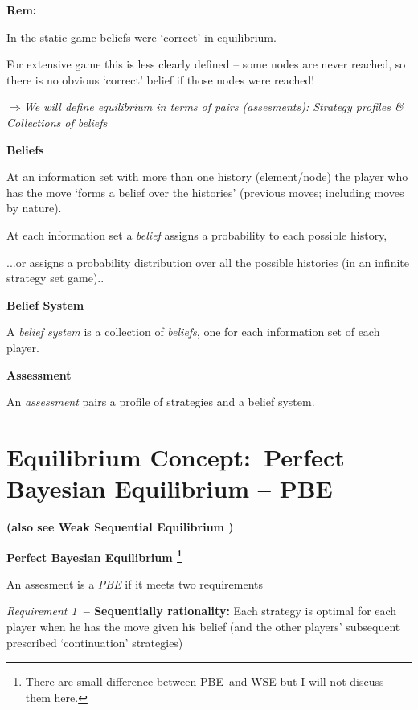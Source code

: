\documentclass{article}
\begin{document}
\textbf{Rem: }\bigskip

In the static game beliefs were `correct' in equilibrium.

\bigskip

For extensive game this is less clearly defined -- some nodes are never
reached, so there is no obvious `correct' belief if those nodes were reached!

\bigskip

$\mathbf{\Longrightarrow }$\textit{We will define equilibrium in terms of
pairs (assesments): Strategy profiles \& Collections of beliefs}

\bigskip

\textbf{Beliefs }

At an information set with more than one history (element/node) the player
who has the move `forms a belief over the histories' (previous moves;
including moves by nature).

At each information set a \textit{belief }assigns a probability to each
possible history,

...or assigns a probability distribution over all the possible histories (in
an infinite strategy set game)..

\bigskip

\textbf{Belief System}

A \textit{belief system }is a collection of \textit{beliefs}, one for each
information set of each player.

\bigskip

\textbf{Assessment}

An \textit{assessment} pairs a profile of strategies and a belief system.

\bigskip

\bigskip

\section{Equilibrium Concept:\ Perfect Bayesian Equilibrium -- PBE}

\textbf{(also see Weak Sequential Equilibrium )}

\bigskip

\textbf{Perfect Bayesian Equilibrium \footnote{%
There are small difference between PBE\ and WSE but I will not discuss them
here.}}

An assesment is a \textit{PBE }if it meets two requirements

\bigskip

\textit{Requirement 1}\textbf{\ -- Sequentially rationality:} Each strategy
is optimal for each player when he has the move given his belief (and the
other players' subsequent prescribed `continuation' strategies)
\end{document}
